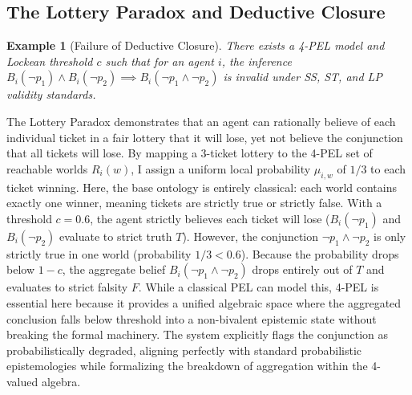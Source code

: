 \documentclass[11pt,a4paper]{article}
\newtheorem{example}{Example}[section]
\begin{document}
\subsection{The Lottery Paradox and Deductive Closure}
\begin{example}[Failure of Deductive Closure]
There exists a 4-PEL model and Lockean threshold $c$ such that for an agent $i$, the inference $B_i(\neg p_1) \land B_i(\neg p_2) \implies B_i(\neg p_1 \land \neg p_2)$ is invalid under SS, ST, and LP validity standards.
\end{example}
The Lottery Paradox demonstrates that an agent can rationally believe of each individual ticket in a fair lottery that it will lose, yet not believe the conjunction that all tickets will lose. 
By mapping a 3-ticket lottery to the 4-PEL set of reachable worlds $R_i(w)$, I assign a uniform local probability $\mu_{i,w}$ of $1/3$ to each ticket winning. Here, the base ontology is entirely classical: each world contains exactly one winner, meaning tickets are strictly true or strictly false.
With a threshold $c=0.6$, the agent strictly believes each ticket will lose ($B_i(\neg p_1)$ and $B_i(\neg p_2)$ evaluate to strict truth $T$). However, the conjunction $\neg p_1 \land \neg p_2$ is only strictly true in one world (probability $1/3 < 0.6$). Because the probability drops below $1-c$, the aggregate belief $B_i(\neg p_1 \land \neg p_2)$ drops entirely out of $T$ and evaluates to strict falsity $F$. 
While a classical PEL can model this, 4-PEL is essential here because it provides a unified algebraic space where the aggregated conclusion falls below threshold into a non-bivalent epistemic state without breaking the formal machinery. The system explicitly flags the conjunction as probabilistically degraded, aligning perfectly with standard probabilistic epistemologies while formalizing the breakdown of aggregation within the 4-valued algebra.
\end{document}
